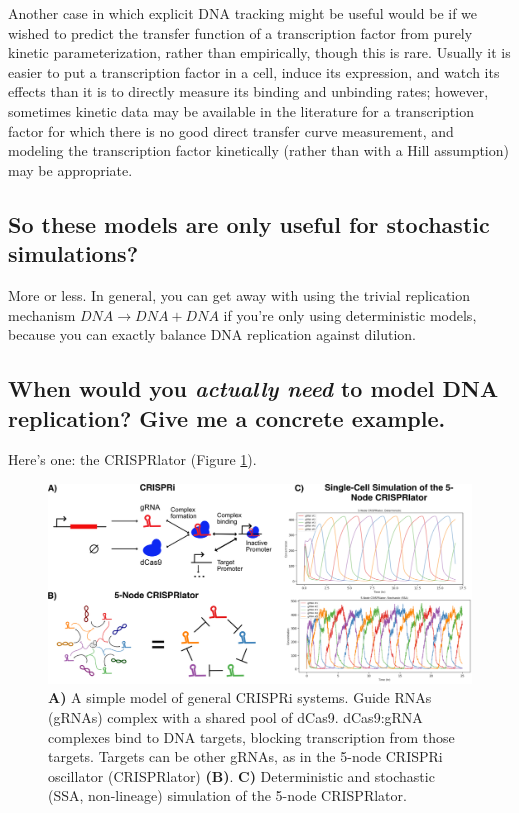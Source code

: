 \documentclass[preprint,12pt]{oldplainarticle}
\begin{document}
Another case in which explicit DNA tracking might be useful would be if we wished to predict the transfer function of a transcription factor from purely kinetic parameterization, rather than empirically, though this is rare. Usually it is easier to put a transcription factor in a cell, induce its expression, and watch its effects than it is to directly measure its binding and unbinding rates; however, sometimes kinetic data may be available in the literature for a transcription factor for which there is no good direct transfer curve measurement, and modeling the transcription factor kinetically (rather than with a Hill assumption) may be appropriate.

\subsection{So these models are only useful for stochastic simulations?}\label{sss:deterministic_ignore}

More or less. In general, you can get away with using the trivial replication mechanism $DNA \to DNA + DNA$ if you're only using deterministic models, because you can exactly balance DNA replication against dilution. 

\subsection{When would you \emph{actually need} to model DNA replication? Give me a concrete example.}\label{ss:CRISPRi}

Here's one: the CRISPRlator (Figure \ref{fig:crispr_overview}).
	
\begin{figure}[!ht]
\centering
\includegraphics[scale=1]{figures/crispr_overview.png}
\caption{\textbf{A)} A simple model of general CRISPRi systems. Guide RNAs (gRNAs) complex with a shared pool of dCas9. dCas9:gRNA complexes bind to DNA targets, blocking transcription from those targets. Targets can be other gRNAs, as in the 5-node CRISPRi oscillator (CRISPRlator) \textbf{(B)}. \textbf{C)} Deterministic and stochastic (SSA, non-lineage) simulation of the 5-node CRISPRlator.}
\label{fig:crispr_overview}
\end{figure}
\end{document}
